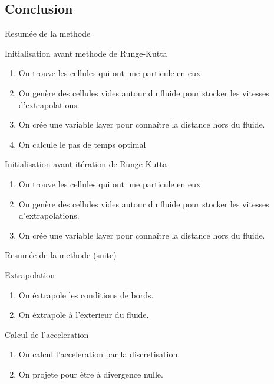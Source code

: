 \subsection{Conclusion}
\begin{frame}{Resumée de la methode}
 \begin{block}{Initialisation avant methode de Runge-Kutta}
  \begin{enumerate}
   \item On trouve les cellules qui ont une particule en eux.
   \item On genère des cellules vides autour du fluide pour stocker les vitesses d'extrapolations.
   \item On crée une variable layer pour connaître la distance hors du fluide.
   \item On calcule le pas de temps optimal
  \end{enumerate}

 \end{block}

  \begin{block}{Initialisation avant itération de Runge-Kutta}
  \begin{enumerate}
   \item On trouve les cellules qui ont une particule en eux.
   \item On genère des cellules vides autour du fluide pour stocker les vitesses d'extrapolations.
   \item On crée une variable layer pour connaître la distance hors du fluide.
  \end{enumerate}

 \end{block}

 
\end{frame}

\begin{frame}{Resumée de la methode (suite)}
 \begin{block}{Extrapolation}
  \begin{enumerate}
   \item On éxtrapole les conditions de bords.
   \item On éxtrapole à l'exterieur du fluide.
  \end{enumerate}

 \end{block}
 \begin{block}{Calcul de l'acceleration}
  \begin{enumerate}
   \item On calcul l'acceleration par la discretisation.
   \item On projete pour être à divergence nulle.
  \end{enumerate}

 \end{block}


\end{frame}



